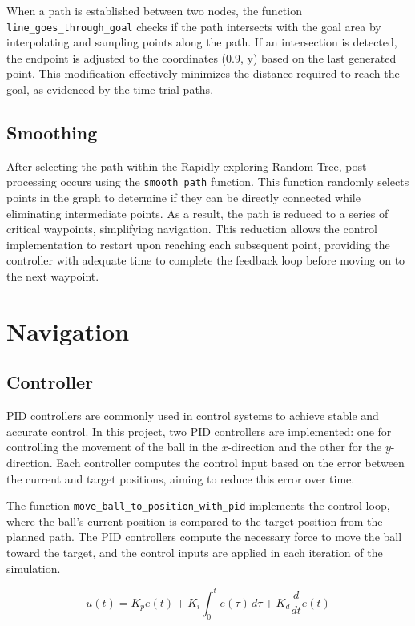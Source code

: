 \documentclass[12pt]{article}
\begin{document}
When a path is established between two nodes, the function \texttt{line\_goes\_through\_goal} checks if the path intersects with the goal area by interpolating and sampling points along the path. If an intersection is detected, the endpoint is adjusted to the coordinates (0.9, y) based on the last generated point. This modification effectively minimizes the distance required to reach the goal, as evidenced by the time trial paths.

\subsection{Smoothing}
After selecting the path within the Rapidly-exploring Random Tree, post-processing occurs using the \texttt{smooth\_path} function. This function randomly selects points in the graph to determine if they can be directly connected while eliminating intermediate points. As a result, the path is reduced to a series of critical waypoints, simplifying navigation. This reduction allows the control implementation to restart upon reaching each subsequent point, providing the controller with adequate time to complete the feedback loop before moving on to the next waypoint.

\section{Navigation}

\subsection{Controller}
PID controllers are commonly used in control systems to achieve stable and accurate control. In this project, two PID controllers are implemented: one for controlling the movement of the ball in the \(x\)-direction and the other for the \(y\)-direction. Each controller computes the control input based on the error between the current and target positions, aiming to reduce this error over time.

The function \texttt{move\_ball\_to\_position\_with\_pid} implements the control loop, where the ball's current position is compared to the target position from the planned path. The PID controllers compute the necessary force to move the ball toward the target, and the control inputs are applied in each iteration of the simulation.

\begin{equation}
u(t) = K_p e(t) + K_i \int_0^t e(\tau) \, d\tau + K_d \frac{d}{dt} e(t)
\end{equation}
\end{document}
